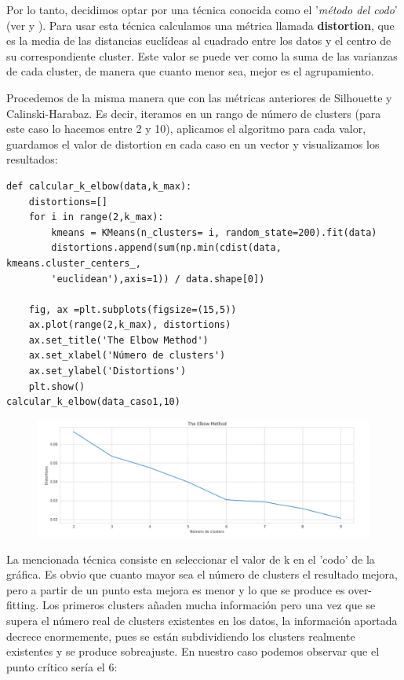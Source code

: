 \documentclass[a4paper,11pt]{book}
\begin{document}
Por lo tanto, decidimos optar por una técnica conocida como el '\textit{método del codo}' (ver \cite{4} y \cite{5} ). Para usar esta técnica calculamos  una métrica llamada \textbf{distortion}, que es la media de las distancias euclídeas al cuadrado entre los datos y el centro de su correspondiente cluster. Este valor se puede ver como la suma de las varianzas de cada cluster, de manera que cuanto menor sea, mejor es el agrupamiento.

Procedemos de la  misma manera que con las métricas anteriores de Silhouette y Calinski-Harabaz. Es decir, iteramos en un rango de número de clusters (para este caso lo hacemos entre 2 y 10), aplicamos el algoritmo para cada valor, guardamos el valor de distortion en cada caso en un vector y visualizamos los resultados:

\begin{verbatim}
def calcular_k_elbow(data,k_max):
	distortions=[] 
	for i in range(2,k_max):
		kmeans = KMeans(n_clusters= i, random_state=200).fit(data)
		distortions.append(sum(np.min(cdist(data, kmeans.cluster_centers_, 
		'euclidean'),axis=1)) / data.shape[0])
		
	fig, ax =plt.subplots(figsize=(15,5))
	ax.plot(range(2,k_max), distortions)
	ax.set_title('The Elbow Method')
	ax.set_xlabel('Número de clusters')
	ax.set_ylabel('Distortions')
	plt.show()
calcular_k_elbow(data_caso1,10)
\end{verbatim}

\begin{figure}
	\centering
	\includegraphics[width=1\linewidth]{img/elbow1}
	\caption{}
	\label{fig:elbow1}
\end{figure}

La mencionada técnica consiste en seleccionar el valor de k en el 'codo' de la gráfica. Es obvio que cuanto mayor sea el número de clusters el resultado mejora, pero a partir de un punto esta mejora es menor y lo que se produce es over-fitting. Los primeros clusters añaden mucha información pero una vez que se supera el número real de clusters existentes en los datos, la información aportada decrece enormemente, pues se están subdividiendo los clusters realmente existentes y se produce sobreajuste. En nuestro caso podemos observar que el punto crítico sería el 6:
\end{document}
